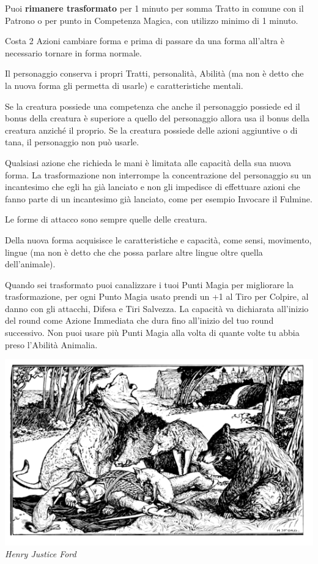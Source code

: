 \begin{multicols}{2}
Puoi \textbf{rimanere trasformato} per 1 minuto per somma Tratto in comune con il Patrono  o per punto in Competenza Magica, con utilizzo minimo di 1 minuto.

Costa 2 Azioni cambiare forma e prima di passare da una forma all'altra è necessario tornare in forma normale.

Il personaggio conserva i propri Tratti, personalità, Abilità (ma non è detto che la nuova forma gli permetta di usarle) e caratteristiche mentali.

Se la creatura possiede una competenza che anche il personaggio possiede ed il bonus della creatura è superiore a quello del personaggio allora usa il bonus della creatura anziché il proprio. Se la creatura possiede delle azioni aggiuntive o di tana, il personaggio non può usarle.

Qualsiasi azione che richieda le mani è limitata alle capacità della sua nuova forma. La trasformazione non interrompe la concentrazione del personaggio su un incantesimo che egli ha già lanciato e non gli impedisce di effettuare azioni che fanno parte di un incantesimo già lanciato, come per esempio Invocare il Fulmine.

Le forme di attacco sono sempre quelle delle creatura.

Della nuova forma acquisisce le caratteristiche e capacità, come sensi, movimento, lingue (ma non è detto che che possa parlare altre lingue oltre quella dell'animale).

Quando sei trasformato puoi canalizzare i tuoi Punti Magia per migliorare la trasformazione, per ogni Punto Magia usato prendi un +1 al Tiro per Colpire, al danno con gli attacchi, Difesa e Tiri Salvezza. La capacità va dichiarata all'inizio del round come Azione Immediata che dura fino all'inizio del tuo round successivo. Non puoi usare più Punti Magia alla volta di quante volte tu abbia preso l'Abilità Animalia.

\begin{center}
\includegraphics[width=0.9\linewidth]{immagini/animalia3.png}
\emph{Henry Justice Ford}
\end{center}


\end{multicols}
